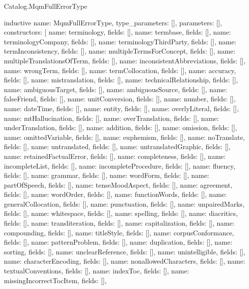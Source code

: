 \begin{lexlean}{Catalog.MqmFullErrorType}
\begin{semanticmodule}
inductive{
  name: MqmFullErrorType,
  type_parameters: [],
  parameters: [],
  constructors: [
    {name: terminology, fields: []},
    {name: termbase, fields: []},
    {name: terminologyCompany, fields: []},
    {name: terminologyThirdParty, fields: []},
    {name: termInconsistency, fields: []},
    {name: multipleTermsForConcept, fields: []},
    {name: multipleTranslationsOfTerm, fields: []},
    {name: inconsistentAbbreviations, fields: []},
    {name: wrongTerm, fields: []},
    {name: termCollocation, fields: []},
    {name: accuracy, fields: []},
    {name: mistranslation, fields: []},
    {name: technicalRelationship, fields: []},
    {name: ambiguousTarget, fields: []},
    {name: ambiguousSource, fields: []},
    {name: falseFriend, fields: []},
    {name: unitConversion, fields: []},
    {name: number, fields: []},
    {name: dateTime, fields: []},
    {name: entity, fields: []},
    {name: overlyLiteral, fields: []},
    {name: mtHallucination, fields: []},
    {name: overTranslation, fields: []},
    {name: underTranslation, fields: []},
    {name: addition, fields: []},
    {name: omission, fields: []},
    {name: omittedVariable, fields: []},
    {name: euphemism, fields: []},
    {name: noTranslate, fields: []},
    {name: untranslated, fields: []},
    {name: untranslatedGraphic, fields: []},
    {name: retainedFactualError, fields: []},
    {name: completeness, fields: []},
    {name: incompleteList, fields: []},
    {name: incompleteProcedure, fields: []},
    {name: fluency, fields: []},
    {name: grammar, fields: []},
    {name: wordForm, fields: []},
    {name: partOfSpeech, fields: []},
    {name: tenseMoodAspect, fields: []},
    {name: agreement, fields: []},
    {name: wordOrder, fields: []},
    {name: functionWords, fields: []},
    {name: generalCollocation, fields: []},
    {name: punctuation, fields: []},
    {name: unpairedMarks, fields: []},
    {name: whitespace, fields: []},
    {name: spelling, fields: []},
    {name: diacritics, fields: []},
    {name: transliteration, fields: []},
    {name: capitalization, fields: []},
    {name: compounding, fields: []},
    {name: titleStyle, fields: []},
    {name: corpusConformance, fields: []},
    {name: patternProblem, fields: []},
    {name: duplication, fields: []},
    {name: sorting, fields: []},
    {name: unclearReference, fields: []},
    {name: unintelligible, fields: []},
    {name: characterEncoding, fields: []},
    {name: nonallowedCharacters, fields: []},
    {name: textualConventions, fields: []},
    {name: indexToc, fields: []},
    {name: missingIncorrectTocItem, fields: []},
}
\end{semanticmodule}
\end{lexlean}

